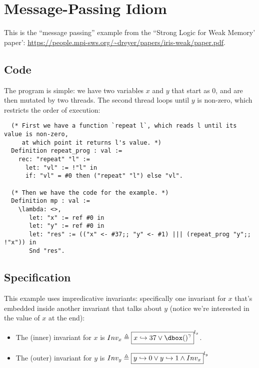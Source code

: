 \section{Message-Passing Idiom}
\label{message-passing-idiom}


This is the ``message passing'' example from the ``Strong Logic for Weak Memory' paper': \url{https://people.mpi-sws.org/~dreyer/papers/iris-weak/paper.pdf}.


\subsection{Code}

The program is simple: we have two variables $x$ and $y$ that start as $0$, and are then mutated by two threads. The second thread loops until $y$ is non-zero, which restricts the order of execution:

\begin{verbatim}
  (* First we have a function `repeat l`, which reads l until its value is non-zero,
     at which point it returns l's value. *)
  Definition repeat_prog : val :=
    rec: "repeat" "l" :=
      let: "vl" := !"l" in
      if: "vl" = #0 then ("repeat" "l") else "vl".

  (* Then we have the code for the example. *)
  Definition mp : val :=
    \lambda: <>,
       let: "x" := ref #0 in
       let: "y" := ref #0 in
       let: "res" := (("x" <- #37;; "y" <- #1) ||| (repeat_prog "y";; !"x")) in
       Snd "res".
\end{verbatim}

\subsection{Specification}

This example uses impredicative invariants: specifically one invariant for $x$ that's embedded inside another invariant that talks about $y$ (notice we're interested in the value of $x$ at the end):
\begin{itemize}
\item The (inner) invariant for $x$ is $Inv_x \triangleq \inv{$\pointsto{x}{37} \lor \ownr{()}{\gamma}$}{l_x}$.

\item The (outer) invariant for $y$ is $Inv_y \triangleq \fbox{$y \hookrightarrow 0 \lor y \hookrightarrow 1 \land  Inv_x$}^{l_y}$
\end{itemize}

